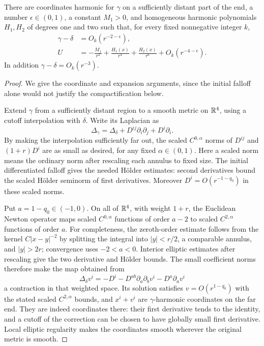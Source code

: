 \begin{lemma}\label{q4:cla:asymptotics}
There are coordinates harmonic for $\gamma$ on a sufficiently distant
part of the end, a number $\epsilon\in(0,1)$, a constant $M_1>0$, and
homogeneous harmonic polynomials $H_1,H_2$ of degrees one and two such
that, for every fixed nonnegative integer $k$,
\begin{align}
 \gamma-\delta&=O_k(r^{-2-\epsilon}),\label{q4:cla:gamma-decay}\\
 U&=-\frac{M_1}{r^2}
       +\frac{H_1(x)}{r^4}
       +\frac{H_2(x)}{r^6}
       +O_k(r^{-4-\epsilon}).\label{q4:cla:U-expansion}
\end{align}
In addition $\gamma-\delta=O_k(r^{-3})$.
\end{lemma}

\begin{proof}
We give the coordinate and expansion arguments, since the initial
falloff alone would not justify the compactification below.

Extend $\gamma$ from a sufficiently distant region to a smooth metric
on $\mathbb R^4$, using a cutoff interpolation with $\delta$.  Write its
Laplacian as
\[
 \Delta_\gamma
 =\Delta_\delta+D^{ij}\partial_i\partial_j+D^i\partial_i.
\]
By making the interpolation sufficiently far out, the scaled
$C^{0,\alpha}$ norms of $D^{ij}$ and $(1+r)D^i$ are as small as desired,
for any fixed $\alpha\in(0,1)$.  Here a scaled norm means the ordinary
norm after rescaling each annulus to fixed size.  The initial
differentiated falloff gives the needed Hölder estimates: second
derivatives bound the scaled Hölder seminorm of first derivatives.
Moreover $D^i=O(r^{-1-q_0})$ in these scaled norms.

Put $a=1-q_0\in(-1,0)$.  On all of $\mathbb R^4$, with weight $1+r$, the
Euclidean Newton operator maps scaled $C^{0,\alpha}$ functions of order
$a-2$ to scaled $C^{2,\alpha}$ functions of order $a$.
For completeness, the zeroth-order estimate follows from the kernel
$C|x-y|^{-2}$ by splitting the integral into $|y|<r/2$, a comparable
annulus, and $|y|>2r$; convergence uses $-2<a<0$.  Interior elliptic
estimates after rescaling give the two derivative and Hölder bounds.
The small coefficient norms therefore make the map obtained from
\[
 \Delta_\delta v^i
 =-D^i-D^{ab}\partial_a\partial_b v^i-D^a\partial_a v^i
\]
a contraction in that weighted space.  Its solution satisfies
$v=O(r^{1-q_0})$ with the stated scaled $C^{2,\alpha}$ bounds, and
$x^i+v^i$ are $\gamma$-harmonic coordinates on the far end.
They are indeed coordinates there: their first derivative tends to
the identity, and a cutoff of the correction can be chosen to have
globally small first derivative.  Local elliptic regularity makes the
coordinates smooth wherever the original metric is smooth.


\end{proof}
